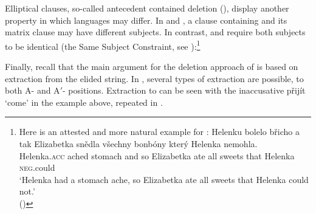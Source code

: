 \documentclass[output=paper,colorlinks,citecolor=brown,]{langsci/langscibook}
\begin{document}
\largerpage[-3]
\noindent Elliptical  clauses, so-called antecedent contained deletion (), display another property in which languages may differ. In  and , a  clause containing  and its matrix clause may have different subjects. In contrast,  and  require both subjects to be identical (the Same Subject Constraint, see ):\footnote{Here is an attested and more natural example for :
\ea
\gll Helenku  bolelo břicho a tak  Elizabetka snědla všechny bonbóny který Helenka nemohla.\\
Helenka.\textsc{acc} ached stomach and so Elizabetka ate all sweets that   Helenka \textsc{neg}.could \\
\glt ‘Helenka had a stomach ache, so Elizabetka ate all sweets that Helenka could not.’\\\xspace\hfill ()\z}

\begin{exe}
\ex \label{22}
\begin{xlist}
\end{xlist}
\end{exe}

\noindent Finally, recall that the main argument for the deletion approach of  is based on extraction from the elided string. In , several types of extraction are possible, to both A- and A$'$- positions. Extraction to  can be seen with the inaccusative  přijít `come' in the example  above, repeated in .
\end{document}

